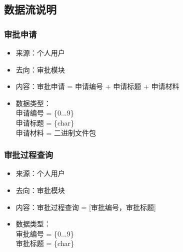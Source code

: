         \subsection{\color{red} 数据流说明}
            
            {\color{red}
            \subsubsection{\color{red} 审批申请}
            \begin{itemize}
                \item 来源：个人用户
                \item 去向：审批模块
                \item 内容：审批申请 = 申请编号 + 申请标题 + 申请材料
                \item 数据类型：\\
                    申请编号 = \{0...9\}\\
                    申请标题 = \{char\}\\
                    申请材料 = 二进制文件包\\
            \end{itemize}

            \subsubsection{\color{red} 审批过程查询}
            \begin{itemize}
                \item 来源：个人用户
                \item 去向：审批模块
                \item 内容：审批过程查询 = [审批编号，审批标题]
                \item 数据类型：\\
                    审批编号 = \{0...9\}\\
                    审批标题 = \{char\}\\
            \end{itemize}
            
}
